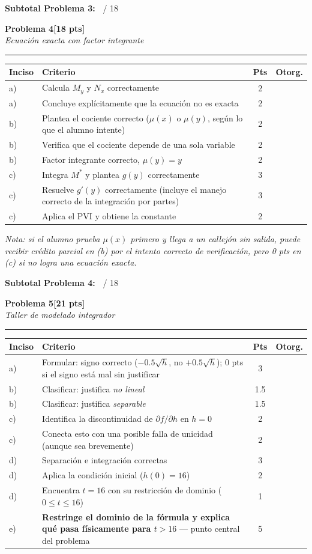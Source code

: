 \documentclass[11pt,letterpaper]{article}
\makeatletter
\newcommand{\problema}[3]{%
  \bigskip\bigskip\noindent
  {\Large\textbf{Problema #1}}\hfill\textbf{[#2 pts]}\\[3pt]
  {\small\itshape #3}\par
  \vspace{2pt}\hrule\vspace{8pt}
}
\newenvironment{tablarubrica}{%
  \begin{tabular}{@{}p{1.1cm}Lcc@{}}
  \toprule
  \textbf{Inciso} & \textbf{Criterio} & \textbf{Pts} & \textbf{Otorg.} \\
  \midrule
}{%
  \bottomrule
  \end{tabular}
}
\makeatother
\begin{document}
\medskip
\noindent\textbf{Subtotal Problema 3:\ } \underline{\hspace{2.5cm}} / 18

\newpage
\problema{4}{18}{Ecuación exacta con factor integrante}

\begin{tablarubrica}
a) & Calcula $M_y$ y $N_x$ correctamente & 2 & \\
a) & Concluye explícitamente que la ecuación no es exacta & 2 & \\
b) & Plantea el cociente correcto ($\mu(x)$ o $\mu(y)$, según lo que el alumno intente) & 2 & \\
b) & Verifica que el cociente depende de una sola variable & 2 & \\
b) & Factor integrante correcto, $\mu(y)=y$ & 2 & \\
c) & Integra $M^*$ y plantea $g(y)$ correctamente & 3 & \\
c) & Resuelve $g'(y)$ correctamente (incluye el manejo correcto de la integración por partes) & 3 & \\
c) & Aplica el PVI y obtiene la constante & 2 & \\
\end{tablarubrica}

\textit{Nota: si el alumno prueba $\mu(x)$ primero y llega a un callejón sin salida, puede recibir crédito parcial en (b) por el intento correcto de verificación, pero 0 pts en (c) si no logra una ecuación exacta.}

\medskip
\noindent\textbf{Subtotal Problema 4:\ } \underline{\hspace{2.5cm}} / 18

\problema{5}{21}{Taller de modelado integrador}

\begin{tablarubrica}
a) & Formular: signo correcto ($-0.5\sqrt h$, no $+0.5\sqrt h$); 0 pts si el signo está mal sin justificar & 3 & \\
b) & Clasificar: justifica \emph{no lineal} & 1.5 & \\
b) & Clasificar: justifica \emph{separable} & 1.5 & \\
c) & Identifica la discontinuidad de $\partial f/\partial h$ en $h=0$ & 2 & \\
c) & Conecta esto con una posible falla de unicidad (aunque sea brevemente) & 2 & \\
d) & Separación e integración correctas & 3 & \\
d) & Aplica la condición inicial ($h(0)=16$) & 2 & \\
d) & Encuentra $t=16$ con su restricción de dominio ($0\le t\le16$) & 1 & \\
e) & \textbf{Restringe el dominio de la fórmula y explica qué pasa físicamente para $t>16$} — punto central del problema & 5 & \\
\end{tablarubrica}
\end{document}
